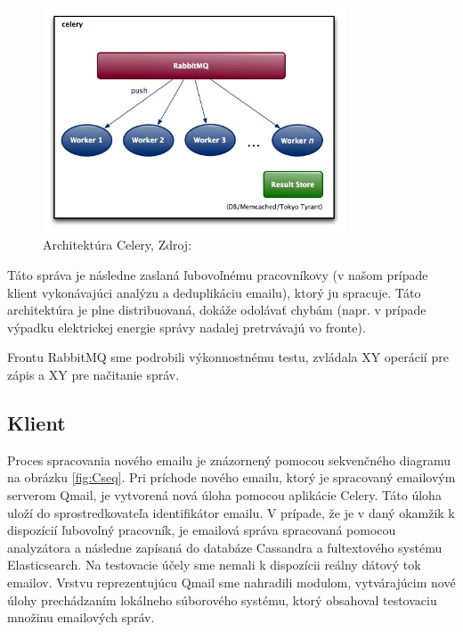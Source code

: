\documentclass[11pt,twoside,a4paper]{book}
\begin{document}
\begin{figure}[h]
 \centering
 \includegraphics[width=9cm]{./figures/Celery.jpg}
 \caption{Architektúra Celery, Zdroj: \cite{celery}}
 \label{fig:Celery}
\end{figure}
Táto správa je následne zaslaná ľubovoľnému pracovníkovy (v našom prípade klient vykonávajúci analýzu a deduplikáciu emailu), ktorý ju spracuje. Táto architektúra je plne distribuovaná, dokáže odolávať chybám (napr. v prípade výpadku elektrickej energie správy nadalej pretrvávajú vo fronte).


Frontu RabbitMQ sme podrobili výkonnostnému testu, zvládala XY operácií pre zápis a XY pre načitanie správ.

\subsection{Klient}

Proces spracovania nového emailu je znázornený pomocou sekvenčného diagramu na obrázku \ref{fig:Cseq}. Pri príchode nového emailu, ktorý je spracovaný emailovým serverom Qmail, je vytvorená nová úloha pomocou aplikácie Celery. Táto úloha uloží do sprostredkovateľa identifikátor emailu. V prípade, že je v daný okamžik k dispozícií ľubovoľný pracovník, je emailová správa spracovaná pomocou analyzátora a následne zapísaná do databáze Cassandra a fultextového systému Elasticsearch. Na testovacie účely sme nemali k dispozícii reálny dátový tok emailov. Vrstvu reprezentujúcu Qmail sme nahradili modulom, vytvárajúcim nové úlohy prechádzaním lokálneho súborového systému, ktorý obsahoval testovaciu množinu emailových správ.
\end{document}
